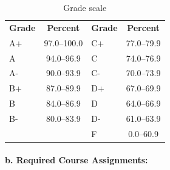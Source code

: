 \documentclass[11pt]{article}     %
\begin{document}
\begin{center}
\begin{table}[h]
  \caption{Grade scale}
  \label{tab:grading-scale}
  \centering
  \begin{tabular}{l c l c}
  \rowcolor{gray!20}
  \textbf{Grade} & \textbf{Percent} & \textbf{Grade} & \textbf{Percent} \\
  A+    & 97.0--100.0& C+    & 77.0--79.9 \\
  A     & 94.0--96.9 & C     & 74.0--76.9 \\
  A-    & 90.0--93.9 & C-    & 70.0--73.9 \\
  B+    & 87.0--89.9 & D+    & 67.0--69.9 \\
  B     & 84.0--86.9 & D     & 64.0--66.9 \\
  B-    & 80.0--83.9 & D-    & 61.0--63.9 \\
        &            & F     & 0.0--60.9 \\
  \end{tabular}
\end{table}
\end{center}

\vspace{1em}
\paragraph*{b. Required Course Assignments:}
\end{document}
